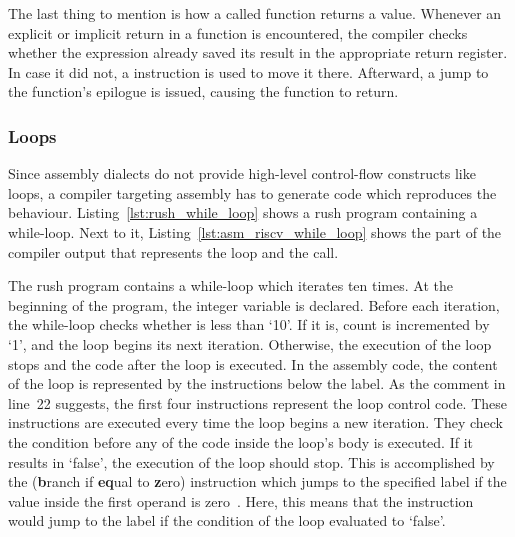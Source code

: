 The last thing to mention is how a called function returns a value.
Whenever an explicit or implicit return in a function is encountered,
the compiler checks whether the expression already saved its result in the appropriate return register.
In case it did not, a  instruction is used to move it there.
Afterward, a jump to the function's epilogue is issued, causing the function to return.

\subsubsection{Loops}

Since assembly dialects do not provide high-level control-flow constructs like loops,
a compiler targeting assembly has to generate code which reproduces the behaviour.
Listing~\ref{lst:rush_while_loop} shows a rush program containing a while-loop.
Next to it, Listing~\ref{lst:asm_riscv_while_loop} shows the part of the compiler output that represents the loop and the  call.

\noindent
\begin{minipage}{.45\textwidth}
	\centering
\end{minipage}%
\hfill
\begin{minipage}{.45\textwidth}
	\centering
	\vspace{.1cm}
\end{minipage}

The rush program contains a while-loop which iterates ten times.
At the beginning of the program, the integer variable  is declared.
Before each iteration, the while-loop checks whether  is less than `10'.
If it is, count is incremented by `1', and the loop begins its next iteration.
Otherwise, the execution of the loop stops and the code after the loop is executed.
In the assembly code, the content of the loop is represented by the instructions below the  label.
As the comment in line~22 suggests, the first four instructions represent the loop control code.
These instructions are executed every time the loop begins a new iteration.
They check the condition before any of the code inside the loop's body is executed.
If it results in `false', the execution of the loop should stop.
This is accomplished by the  (\textbf{b}ranch if \textbf{eq}ual to \textbf{z}ero) instruction which jumps to the specified label if the value inside the first operand is zero~\cite[p.~105]{Waterman2019}.
Here, this means that the instruction would jump to the  label if the condition of the loop evaluated to `false'.

